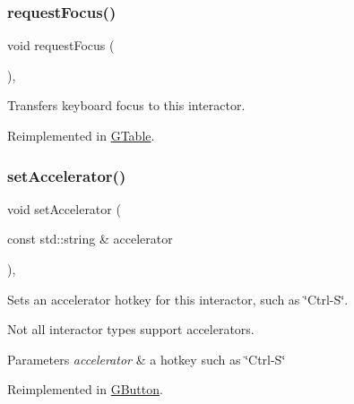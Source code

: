 \subsubsection{\texorpdfstring{request\+Focus()}{requestFocus()}}
{\footnotesize\ttfamily void request\+Focus (\begin{DoxyParamCaption}{ }\end{DoxyParamCaption})\hspace{0.3cm}{\ttfamily [virtual]}, {\ttfamily [inherited]}}



Transfers keyboard focus to this interactor. 



Reimplemented in \mbox{\hyperlink{classGTable_a5921efd0a5a83eacebdadb749fb3ea7a}{G\+Table}}.

\mbox{\label{classGInteractor_ad15f102f62e2960576012f1aa0ba4b2e}} 
\subsubsection{\texorpdfstring{set\+Accelerator()}{setAccelerator()}}
{\footnotesize\ttfamily void set\+Accelerator (\begin{DoxyParamCaption}\item[{const std\+::string \&}]{accelerator }\end{DoxyParamCaption})\hspace{0.3cm}{\ttfamily [virtual]}, {\ttfamily [inherited]}}



Sets an accelerator hotkey for this interactor, such as \char`\"{}\+Ctrl-\/\+S\char`\"{}. 

Not all interactor types support accelerators. 
\begin{DoxyParams}{Parameters}
{\em accelerator} & a hotkey such as \char`\"{}\+Ctrl-\/\+S\char`\"{} \\
\hline
\end{DoxyParams}


Reimplemented in \mbox{\hyperlink{classGButton_a502f311e78e7531f8a7b50054ce91c85}{G\+Button}}.

\mbox{\label{classGInteractor_a4b5843fe3030e038a1ba54cc03389bcf}} 
